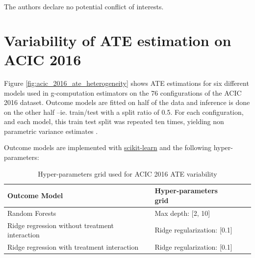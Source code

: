 \documentclass[10pt]{article}
\begin{document}
The authors declare no potential conflict of interests.

\printbibliography

\clearpage

\appendix


\section{Variability of ATE estimation on ACIC
  2016}\label{apd:toy_example:acic_2016_ate_variability}

Figure \ref{fig:acic_2016_ate_heterogeneity} shows ATE estimations for six
different models used in g-computation estimators on the 76 configurations of
the ACIC 2016 dataset. Outcome models are fitted on half of the data and
inference is done on the other half --ie. train/test with a split ratio of 0.5.
For each configuration, and each model, this train test split was repeated ten
times, yielding non parametric variance estimates
\cite{bouthillier_accounting_2021}.

Outcome models are implemented with
\href{https://scikit-learn.org/stable/}{scikit-learn}
\cite{pedregosa_scikitlearn_2011} and the following hyper-parameters:

\begin{table}[h!]
    \centering
    \begin{tabular}{llll}
        \toprule
        Outcome Model                                  & Hyper-parameters grid
        \\
        \midrule
        Random Forests                                 & Max depth: [2,
        10]                                                                    \\

        Ridge regression without treatment interaction & Ridge regularization:
        [0.1]                                                                  \\

        Ridge regression with treatment interaction    & Ridge regularization:
        [0.1]                                                                  \\
        \bottomrule
    \end{tabular}
    \caption{Hyper-parameters grid used for ACIC 2016 ATE variability}
    \label{apd:toy_example:acic_2016_ate_variability:table}
\end{table}
\end{document}
